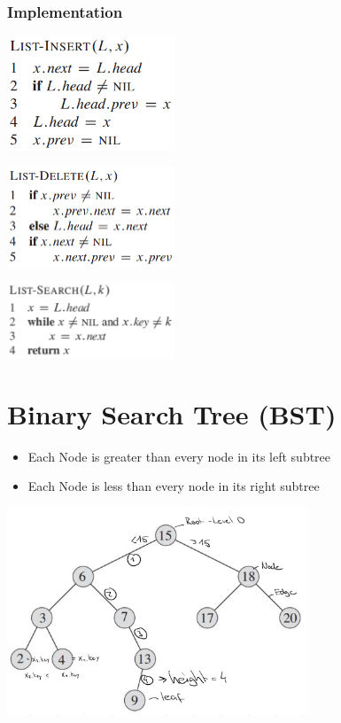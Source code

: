 \documentclass[10pt,a4paper,twocolumn]{article}
\begin{document}
\subsubsection{Implementation}
\begin{center}
\includegraphics[width=5cm]{images/linkedlist-insert.png}
\end{center}

\begin{center}
\includegraphics[width=5cm]{images/linkedlist-delete.png}
\end{center}

\begin{center}
\includegraphics[width=5cm]{images/linkedlist-search.png}
\end{center}

\section{Binary Search Tree (BST)}

\begin{itemize}
	\item Each Node is greater than every node in its left subtree
	\item Each Node is less than every node in its right subtree
\end{itemize}

\begin{center}
	\includegraphics[width=9cm]{images/bst1}
\end{center}
\end{document}

